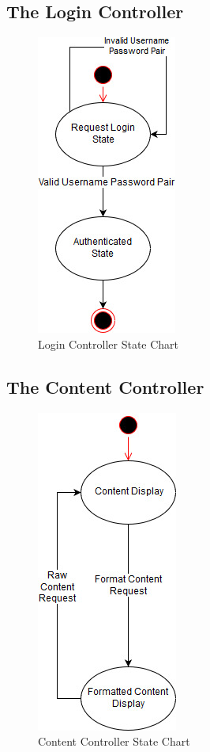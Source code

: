 \documentclass[]{article}
\begin{document}
\subsection{The Login Controller}
{
\begin{figure}[H]
  \centering
  \includegraphics[scale=0.5]{A3_Assets/LoginController.jpg}
  \caption{Login Controller State Chart}
\end{figure}
}

\subsection{The Content Controller}
{
\begin{figure}[H]
  \centering
  \includegraphics[scale=0.5]{A3_Assets/ContentController.jpg}
  \caption{Content Controller State Chart}
\end{figure}
}
\end{document}
